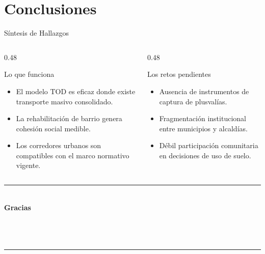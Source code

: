 
\section{Conclusiones}

\begin{frame}{Síntesis de Hallazgos}
  \begin{columns}[T]
    \begin{column}{0.48\textwidth}
      \begin{block}{Lo que funciona}
        \begin{itemize}
          \item El modelo TOD es eficaz donde existe transporte masivo consolidado.
          \item La rehabilitación de barrio genera cohesión social medible.
          \item Los corredores urbanos son compatibles con el marco normativo vigente.
        \end{itemize}
      \end{block}
    \end{column}
    \begin{column}{0.48\textwidth}
      \begin{alertblock}{Los retos pendientes}
        \begin{itemize}
          \item Ausencia de instrumentos de captura de plusvalías.
          \item Fragmentación institucional entre municipios y alcaldías.
          \item Débil participación comunitaria en decisiones de uso de suelo.
        \end{itemize}
      \end{alertblock}
    \end{column}
  \end{columns}
\end{frame}

\begin{frame}[plain]
  \begin{center}
    \vfill
    {\color{ColorAcento}\rule{0.6\textwidth}{1.5pt}}\\[0.5cm]
    {\Large\bfseries\color{ColorPrincipal} Gracias}\\[0.3cm]
    {\normalsize \Autor}\\[0.1cm]
    {\small \MateriaCorta}\\[0.1cm]
    {\small \Semestre}\\[0.5cm]
    {\color{ColorAcento}\rule{0.6\textwidth}{1.5pt}}
    \vfill
  \end{center}
\end{frame}
